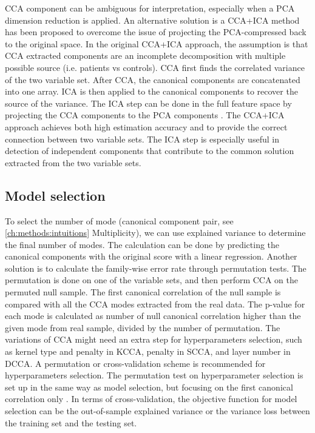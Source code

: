 CCA component can be ambiguous for interpretation, especially when a PCA dimension reduction is applied. An alternative solution is a  CCA+ICA method \cite{MillerK2016,Sui2010} has been proposed to overcome the issue of projecting the PCA-compressed back to the original space. In the original CCA+ICA approach, the assumption is that CCA extracted components are an incomplete decomposition with multiple possible source (i.e. patients vs controls). CCA first finds the correlated variance of the two variable set. After CCA, the canonical components are concatenated into one array. ICA is then applied to the canonical components to recover the source of the variance. The ICA step can be done in the full feature space by projecting the CCA components to the PCA components \cite{MillerK2016}. The CCA+ICA approach achieves both high estimation accuracy and to provide the correct connection between two variable sets. The ICA step is especially useful in detection of independent components that contribute to the common solution extracted from the two variable sets. 

\subsection{Model selection}
To select the number of mode (canonical component pair, see \cref{ch:methods:intuitions} Multiplicity), we can use explained variance to determine the final number of modes. The calculation can be done by predicting the canonical components with the original score with a linear regression. Another solution is to calculate the family-wise error rate through permutation tests.  The permutation is done on one of the variable sets, and then perform CCA on the permuted null sample. The first canonical correlation of the null sample is compared with all the CCA modes extracted from the real data. The p-value for each mode is calculated as number of null canonical correlation higher than the given mode from real sample, divided by  the number of permutation.
The variations of CCA might need an extra step for hyperparameters selection, such as kernel type and penalty in KCCA, penalty in SCCA, and layer number in DCCA. A permutation or cross-validation scheme is recommended for hyperparameters selection. The permutation test on hyperparameter selection is set up in the same way as model selection, but focusing on the first canonical correlation only \cite<For example, see Appendix A in>{WittenSCCA2009}. In terms of cross-validation, the objective function for model selection can be the out-of-sample explained variance or the variance loss between the training set and the testing set. 


